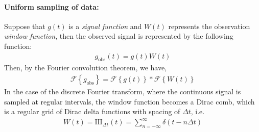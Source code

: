     			\paragraph{Uniform sampling of data:}
    			Suppose that $g(t)$ is a \textit{signal function} and $W(t)$ represents the observation \textit{window function}, then the observed signal is represented by the following function:
    			\begin{align}
    				g_\text{obs}(t)=g(t)W(t) \label{eqn:obs-func}
    			\end{align}
    			Then, by the Fourier convolution theorem, we have,
    			\begin{align}
    				\mathscr{F}\left\lbrace g_\text{obs} \right\rbrace = \mathscr{F}\left\lbrace g(t) \right\rbrace * \mathscr{F}\left\lbrace W(t) \right\rbrace \label{eqn:FT-obs-func}
    			\end{align}
    			In the case of the discrete Fourier transform, where the continuous signal is sampled at regular intervals, the window function becomes a Dirac comb, which is a regular grid of Dirac delta functions with spacing of $\Delta t$, i.e.
    			\begin{align}
    				W(t)=\text{III}_{\Delta t}(t)=\sum_{n=-\infty}^{\infty}{\delta(t-n\Delta t)} \label{eqn:dirac-comb}
    			\end{align}
    			
